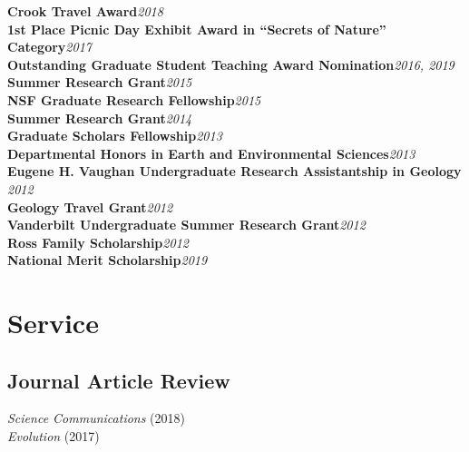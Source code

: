 \documentclass[12pt]{article}
\begin{document}
\textbf{Crook Travel Award}\hfill \emph{2018}\\
\textbf{1st Place Picnic Day Exhibit Award in “Secrets of Nature” Category}\hfill \emph{2017}\\
\textbf{Outstanding Graduate Student Teaching Award Nomination}\hfill \emph{2016, 2019}\\
\textbf{Summer Research Grant}\hfill \emph{2015}\\
\textbf{NSF Graduate Research Fellowship}\hfill \emph{2015}\\
\textbf{Summer Research Grant}\hfill \emph{2014}\\
\textbf{Graduate Scholars Fellowship}\hfill \emph{2013}\\
\textbf{Departmental Honors in Earth and Environmental Sciences}\hfill \emph{2013}\\
\textbf{Eugene H. Vaughan Undergraduate Research Assistantship in Geology }\hfill \emph{2012}\\
\textbf{Geology Travel Grant}\hfill \emph{2012}\\
\textbf{Vanderbilt Undergraduate Summer Research Grant}\hfill \emph{2012}\\
\textbf{Ross Family Scholarship}\hfill \emph{2012}\\
\textbf{National Merit Scholarship}\hfill \emph{2019}\\




\section{Service}

\subsection{Journal Article Review}

\emph{Science Communications} (2018)\\
\emph{Evolution} (2017)
\end{document}
